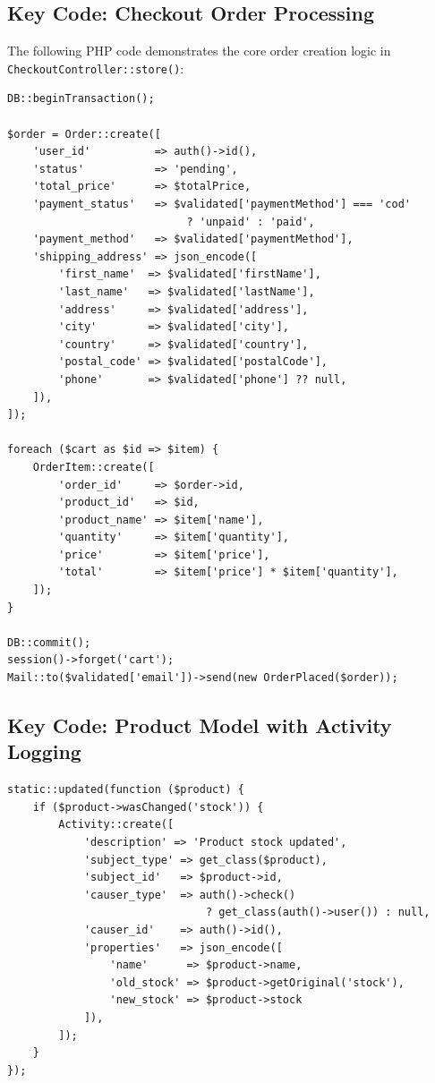 \subsection{Key Code: Checkout Order Processing}
The following PHP code demonstrates the core order creation logic in \texttt{CheckoutController::store()}:

\begin{lstlisting}[style=phpstyle]
DB::beginTransaction();

$order = Order::create([
    'user_id'          => auth()->id(),
    'status'           => 'pending',
    'total_price'      => $totalPrice,
    'payment_status'   => $validated['paymentMethod'] === 'cod' 
                            ? 'unpaid' : 'paid',
    'payment_method'   => $validated['paymentMethod'],
    'shipping_address' => json_encode([
        'first_name'  => $validated['firstName'],
        'last_name'   => $validated['lastName'],
        'address'     => $validated['address'],
        'city'        => $validated['city'],
        'country'     => $validated['country'],
        'postal_code' => $validated['postalCode'],
        'phone'       => $validated['phone'] ?? null,
    ]),
]);

foreach ($cart as $id => $item) {
    OrderItem::create([
        'order_id'     => $order->id,
        'product_id'   => $id,
        'product_name' => $item['name'],
        'quantity'     => $item['quantity'],
        'price'        => $item['price'],
        'total'        => $item['price'] * $item['quantity'],
    ]);
}

DB::commit();
session()->forget('cart');
Mail::to($validated['email'])->send(new OrderPlaced($order));
\end{lstlisting}

\subsection{Key Code: Product Model with Activity Logging}
\begin{lstlisting}[style=phpstyle]
static::updated(function ($product) {
    if ($product->wasChanged('stock')) {
        Activity::create([
            'description' => 'Product stock updated',
            'subject_type' => get_class($product),
            'subject_id'   => $product->id,
            'causer_type'  => auth()->check() 
                               ? get_class(auth()->user()) : null,
            'causer_id'    => auth()->id(),
            'properties'   => json_encode([
                'name'      => $product->name,
                'old_stock' => $product->getOriginal('stock'),
                'new_stock' => $product->stock
            ]),
        ]);
    }
});
\end{lstlisting}

